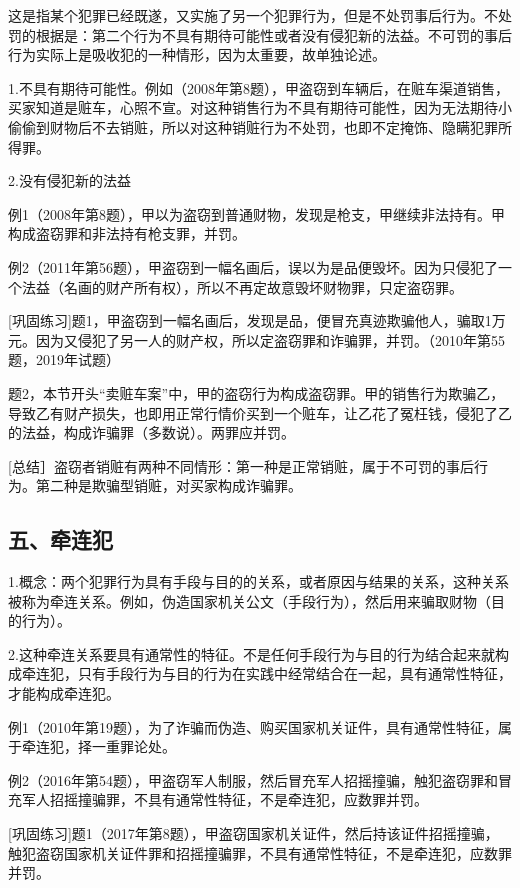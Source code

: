 这是指某个犯罪已经既遂，又实施了另一个犯罪行为，但是不处罚事后行为。不处罚的根据是：第二个行为不具有期待可能性或者没有侵犯新的法益。不可罚的事后行为实际上是吸收犯的一种情形，因为太重要，故单独论述。

1.不具有期待可能性。例如（2008年第8题），甲盗窃到车辆后，在赃车渠道销售，买家知道是赃车，心照不宣。对这种销售行为不具有期待可能性，因为无法期待小偷偷到财物后不去销赃，所以对这种销赃行为不处罚，也即不定掩饰、隐瞒犯罪所得罪。

2.没有侵犯新的法益

例1（2008年第8题），甲以为盗窃到普通财物，发现是枪支，甲继续非法持有。甲构成盗窃罪和非法持有枪支罪，并罚。

例2（2011年第56题），甲盗窃到一幅名画后，误以为是品便毁坏。因为只侵犯了一个法益（名画的财产所有权），所以不再定故意毁坏财物罪，只定盗窃罪。

[巩固练习]题1，甲盗窃到一幅名画后，发现是品，便冒充真迹欺骗他人，骗取1万元。因为又侵犯了另一人的财产权，所以定盗窃罪和诈骗罪，并罚。（2010年第55题，2019年试题）

题2，本节开头“卖赃车案”中，甲的盗窃行为构成盗窃罪。甲的销售行为欺骗乙，导致乙有财产损失，也即用正常行情价买到一个赃车，让乙花了冤枉钱，侵犯了乙的法益，构成诈骗罪（多数说）。两罪应并罚。

[总结］盗窃者销赃有两种不同情形：第一种是正常销赃，属于不可罚的事后行为。第二种是欺骗型销赃，对买家构成诈骗罪。

\subsection*{五、牵连犯}

1.概念：两个犯罪行为具有手段与目的的关系，或者原因与结果的关系，这种关系被称为牵连关系。例如，伪造国家机关公文（手段行为），然后用来骗取财物（目的行为）。

2.这种牵连关系要具有通常性的特征。不是任何手段行为与目的行为结合起来就构成牵连犯，只有手段行为与目的行为在实践中经常结合在一起，具有通常性特征，才能构成牵连犯。

例1（2010年第19题），为了诈骗而伪造、购买国家机关证件，具有通常性特征，属于牵连犯，择一重罪论处。

例2（2016年第54题），甲盗窃军人制服，然后冒充军人招摇撞骗，触犯盗窃罪和冒充军人招摇撞骗罪，不具有通常性特征，不是牵连犯，应数罪并罚。

[巩固练习]题1（2017年第8题），甲盗窃国家机关证件，然后持该证件招摇撞骗，触犯盗窃国家机关证件罪和招摇撞骗罪，不具有通常性特征，不是牵连犯，应数罪并罚。

